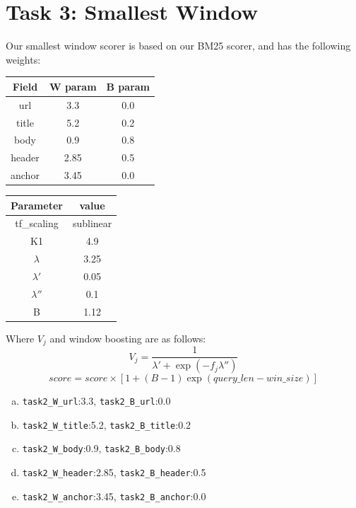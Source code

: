 \documentclass[10pt,twocolumn]{article}
\begin{document}
\section*{Task 3: Smallest Window}
Our smallest window scorer is based on our BM25 scorer, and has the following weights:
\begin{table}[H]
\centering
\begin{tabular}{|c|c|c|}
\hline
Field & W param & B param\\\hline
url & 3.3 & 0.0\\\hline
title & 5.2 & 0.2\\\hline
body & 0.9 & 0.8\\\hline
header & 2.85 & 0.5 \\\hline
anchor & 3.45 & 0.0\\\hline
\end{tabular}
\end{table}
\begin{table}[H]
\centering
\begin{tabular}{|c|c|}
\hline
Parameter & value\\\hline
tf\_scaling & sublinear\\\hline
K1 & 4.9\\\hline
$\lambda$ & 3.25\\\hline
$\lambda'$ & 0.05\\\hline
$\lambda''$ & 0.1\\\hline
B & 1.12\\\hline
\end{tabular}
\end{table}
Where $V_j$ and window boosting are as follows:
\begin{equation*}
V_j = \frac{1}{\lambda'+\exp({-f_j\lambda''})}
\end{equation*}
\begin{equation*}
score = score \times [1+(B-1)\exp(query\_len-win\_size)]
\end{equation*}

\begin{enumerate}[(a)]
\item \texttt{task2\_W\_url}:3.3, \texttt{task2\_B\_url}:0.0

\item \texttt{task2\_W\_title}:5.2, \texttt{task2\_B\_title}:0.2

\item \texttt{task2\_W\_body}:0.9, \texttt{task2\_B\_body}:0.8

\item \texttt{task2\_W\_header}:2.85, \texttt{task2\_B\_header}:0.5

\item \texttt{task2\_W\_anchor}:3.45, \texttt{task2\_B\_anchor}:0.0

\end{enumerate}
\end{document}
